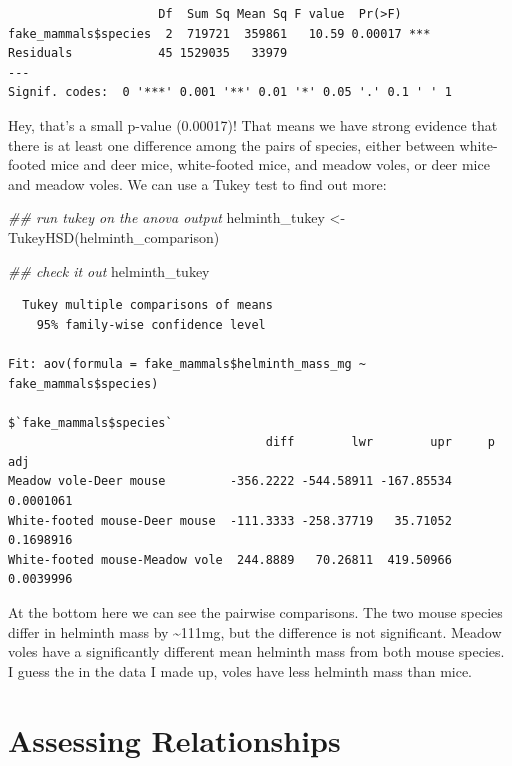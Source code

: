 \documentclass[
  letterpaper,
  DIV=11,
  numbers=noendperiod]{scrreprt}
\newenvironment{Shaded}{\begin{snugshade}}{\end{snugshade}}
\newcommand{\DocumentationTok}[1]{\textcolor[rgb]{0.37,0.37,0.37}{\textit{#1}}}
\newcommand{\FunctionTok}[1]{\textcolor[rgb]{0.28,0.35,0.67}{#1}}
\newcommand{\NormalTok}[1]{\textcolor[rgb]{0.00,0.23,0.31}{#1}}
\newcommand{\OtherTok}[1]{\textcolor[rgb]{0.00,0.23,0.31}{#1}}
\begin{document}
\begin{verbatim}
                     Df  Sum Sq Mean Sq F value  Pr(>F)    
fake_mammals$species  2  719721  359861   10.59 0.00017 ***
Residuals            45 1529035   33979                    
---
Signif. codes:  0 '***' 0.001 '**' 0.01 '*' 0.05 '.' 0.1 ' ' 1
\end{verbatim}

Hey, that's a small p-value (0.00017)! That means we have strong
evidence that there is at least one difference among the pairs of
species, either between white-footed mice and deer mice, white-footed
mice, and meadow voles, or deer mice and meadow voles. We can use a
Tukey test to find out more:

\begin{Shaded}
\begin{Highlighting}[]
\DocumentationTok{\#\# run tukey on the anova output}
\NormalTok{helminth\_tukey }\OtherTok{\textless{}{-}} \FunctionTok{TukeyHSD}\NormalTok{(helminth\_comparison)}

\DocumentationTok{\#\# check it out}
\NormalTok{helminth\_tukey}
\end{Highlighting}
\end{Shaded}

\begin{verbatim}
  Tukey multiple comparisons of means
    95% family-wise confidence level

Fit: aov(formula = fake_mammals$helminth_mass_mg ~ fake_mammals$species)

$`fake_mammals$species`
                                    diff        lwr        upr     p adj
Meadow vole-Deer mouse         -356.2222 -544.58911 -167.85534 0.0001061
White-footed mouse-Deer mouse  -111.3333 -258.37719   35.71052 0.1698916
White-footed mouse-Meadow vole  244.8889   70.26811  419.50966 0.0039996
\end{verbatim}

At the bottom here we can see the pairwise comparisons. The two mouse
species differ in helminth mass by \textasciitilde111mg, but the
difference is not significant. Meadow voles have a significantly
different mean helminth mass from both mouse species. I guess the in the
data I made up, voles have less helminth mass than mice.

\hypertarget{assessing-relationships}{%
\section{Assessing Relationships}\label{assessing-relationships}}
\end{document}
